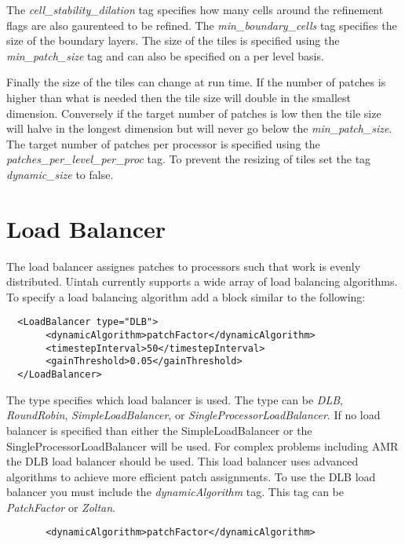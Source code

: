 The \emph{cell\_stability\_dilation} tag specifies how many cells around
the refinement flags are also gaurenteed to be refined.  The
\emph{min\_boundary\_cells} tag specifies the size of the boundary layers. 
The size of the tiles is specified using the \emph{min\_patch\_size} tag
and can also be specified on a per level basis.

Finally the size of the tiles can change at run time.  If the number
of patches is higher than what is needed then the tile size will double in
the smallest dimension.  Conversely if the target number of patches is low
then the tile size will halve in the longest dimension but will never go
below the \emph{min\_patch\_size}.  The target number of patches per processor is 
specified using the \emph{patches\_per\_level\_per\_proc} tag. To prevent the 
resizing of tiles set the tag \emph{dynamic\_size} to false. 

%
\section{Load Balancer}

The load balancer assignes patches to processors such that work is 
evenly distributed.  Uintah currently supports a wide array of 
load balancing algorithms.  To specify a load balancing algorithm 
add a block similar to the following:

\begin{Verbatim}
  <LoadBalancer type="DLB">
       <dynamicAlgorithm>patchFactor</dynamicAlgorithm>
       <timestepInterval>50</timestepInterval>
       <gainThreshold>0.05</gainThreshold>
  </LoadBalancer>
\end{Verbatim}

The type specifies which load balancer is used.  The type can be \emph{DLB}, 
\emph{RoundRobin}, \emph{SimpleLoadBalancer}, or \emph{SingleProcessorLoadBalancer}.  
If no load balancer is specified than either the SimpleLoadBalancer 
or the SingleProcessorLoadBalancer will be used.  For complex problems including 
AMR the DLB load  balancer should be used.  This load balancer uses advanced 
algorithms to achieve more efficient patch assignments.  To use the DLB load 
balancer you must include the  \emph{dynamicAlgorithm} tag. This tag can be 
\emph{PatchFactor} or \emph{Zoltan}.  

\begin{Verbatim}
       <dynamicAlgorithm>patchFactor</dynamicAlgorithm>
\end{Verbatim}

